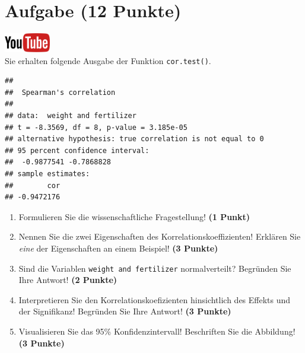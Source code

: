\documentclass[a4paper, 10pt]{scrartcl}\usepackage[]{graphicx}\usepackage[]{xcolor}
\makeatletter
\newenvironment{kframe}{%
 \def\at@end@of@kframe{}%
 \ifinner\ifhmode%
  \def\at@end@of@kframe{\end{minipage}}%
  \begin{minipage}{\columnwidth}%
 \fi\fi%
 \def\FrameCommand##1{\hskip\@totalleftmargin \hskip-\fboxsep
 \colorbox{shadecolor}{##1}\hskip-\fboxsep
     \hskip-\linewidth \hskip-\@totalleftmargin \hskip\columnwidth}%
 \MakeFramed {\advance\hsize-\width
   \@totalleftmargin\z@ \linewidth\hsize
   \@setminipage}}%
 {\par\unskip\endMakeFramed%
 \at@end@of@kframe}
\newenvironment{knitrout}{}{} %
\makeatother
\begin{document}
 
\clearpage

\section{Aufgabe \hfill (12 Punkte)}

\hfill\href{https://youtu.be/C9skfFRTHhI}{\includegraphics[width =
   2cm]{img/youtube}}\\[1Ex]

Sie erhalten folgende \Rlogo Ausgabe der Funktion \texttt{cor.test()}.

\begin{knitrout}
\color{fgcolor}\begin{kframe}
\begin{verbatim}
## 
## 	Spearman's correlation
## 
## data:  weight and fertilizer
## t = -8.3569, df = 8, p-value = 3.185e-05
## alternative hypothesis: true correlation is not equal to 0
## 95 percent confidence interval:
##  -0.9877541 -0.7868828
## sample estimates:
##        cor 
## -0.9472176
\end{verbatim}
\end{kframe}
\end{knitrout}


\begin{enumerate}
  \item Formulieren Sie die wissenschaftliche Fragestellung! \textbf{(1
Punkt)}
\item Nennen Sie die zwei Eigenschaften des Korrelationskoeffizienten!
  Erkl{\"a}ren Sie \textit{eine} der Eigenschaften an einem Beispiel! \textbf{(3
    Punkte)}
\item Sind die Variablen \texttt{weight and fertilizer} normalverteilt?
  Begr{\"u}nden Sie Ihre Antwort! \textbf{(2 Punkte)}
\item Interpretieren Sie den Korrelationskoefizienten hinsichtlich des
  Effekts und der Signifikanz! Begr{\"u}nden Sie
  Ihre Antwort! \textbf{(3 Punkte)}
\item Visualisieren Sie das 95\% Konfidenzintervall! Beschriften Sie die Abbildung! \textbf{(3 Punkte)} 
\end{enumerate} 
\clearpage
\end{document}
